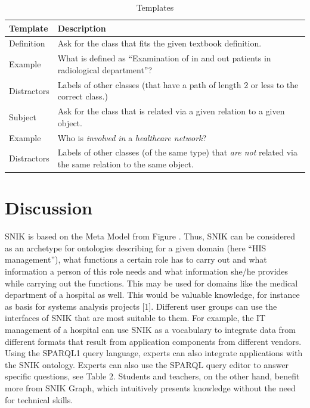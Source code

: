 \documentclass[sw]{iosart2x}
\begin{document}
\begin{table}
\caption{Templates}
\label{tab:templates}
\begin{tabulary}{\textwidth}{lL}
\toprule
\textbf{Template}	&\textbf{Description}\\
\midrule
Definition		&Ask for the class that fits the given textbook definition.\\
Example			&What is defined as \enquote{Examination of in and out patients in radiological department}?\\
Distractors		&Labels of other classes (that have a path of length 2 or less to the correct class.)\\
\midrule
Subject			&Ask for the class that is related via a given relation to a given object.\\
Example			&Who is \emph{involved in} a \emph{healthcare network}?\\
Distractors		&Labels of other classes (of the same type) that \emph{are not} related via the same relation to the same object.\\
\bottomrule
\end{tabulary}
\end{table}



\section{Discussion}
SNIK is based on the Meta Model from Figure .
Thus, SNIK can be considered as an archetype for ontologies describing for a given domain (here \enquote{HIS management}), what functions a certain role has to carry out and what information a person of this role needs and what information she/he provides while carrying out the functions.
This may be used for domains like the medical department of a hospital as well.
This would be valuable knowledge, for instance as basis for systems analysis projects [1].
Different user groups can use the interfaces of SNIK that are most suitable to them.
For example, the IT management of a hospital can use SNIK as a vocabulary to integrate data from different formats that result from application components from different vendors.
Using the SPARQL1 query language, experts can also integrate applications with the SNIK ontology.
 Experts can also use the SPARQL query editor to answer specific questions, see Table 2.
Students and teachers, on the other hand, benefit more from SNIK Graph, which intuitively presents knowledge without the need for technical skills.
\end{document}
